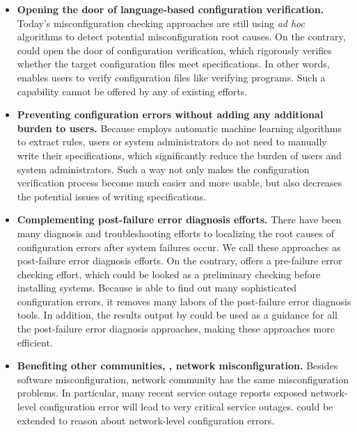 \begin{itemize}

\item {\bf Opening the door of language-based configuration verification.}
  Today's misconfiguration checking approaches are still using {\em ad hoc}
  algorithms to detect potential misconfiguration root causes. On the
  contrary, \app could open the door of configuration verification,
  which rigorously verifies whether the target configuration files meet
  specifications. In other words, \app enables users 
  to verify configuration files like verifying programs. Such a capability
  cannot be offered by any of existing efforts.

\item {\bf Preventing configuration errors without adding any additional
  burden to users.} Because \app employs automatic machine learning 
  algorithms to extract rules, users or system administrators do not need
  to manually write their specifications, which significantly reduce the
  burden of users and system administrators. Such a way not only
  makes the configuration verification process become much easier and more 
  usable, but also decreases the potential issues of writing 
  specifications.

\item {\bf Complementing post-failure error diagnosis efforts.}
  There have been many diagnosis and troubleshooting efforts to localizing
  the root causes of configuration errors after system failures occur.
  We call these approaches as post-failure error diagnosis efforts.
  On the contrary, \app offers a pre-failure error checking effort,
  which could be looked as a preliminary checking before installing
  systems. Because \app is able to find out many sophisticated 
  configuration errors, it removes many labors of 
  the post-failure error diagnosis tools. In addition, the results
  output by \app could be used as a guidance for all the post-failure
  error diagnosis approaches, making these approaches more efficient.

\item {\bf Benefiting other communities, \eg, network misconfiguration.} 
  Besides software misconfiguration, network community has the same 
  misconfiguration problems. In particular, many recent service outage 
  reports exposed network-level configuration error will lead to
  very critical service outages. \app could be extended to reason about
  network-level configuration errors.

\end{itemize}

